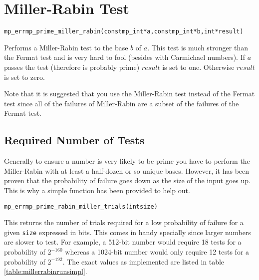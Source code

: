 \documentclass[synpaper]{book}
\begin{document}
\section{Miller-Rabin Test}
\begin{alltt}
mp_err mp_prime_miller_rabin (const mp_int *a, const mp_int *b, int *result)
\end{alltt}
Performs a Miller-Rabin test to the base $b$ of $a$.  This test is much stronger than the Fermat test and is very hard to
fool (besides with Carmichael numbers).  If $a$ passes the test (therefore is probably prime) $result$ is set to one.
Otherwise $result$ is set to zero.

Note that it is suggested that you use the Miller-Rabin test instead of the Fermat test since all of the failures of
Miller-Rabin are a subset of the failures of the Fermat test.

\subsection{Required Number of Tests}
Generally to ensure a number is very likely to be prime you have to perform the Miller-Rabin with at least a half-dozen
or so unique bases.  However, it has been proven that the probability of failure goes down as the size of the input goes up.
This is why a simple function has been provided to help out.

\begin{alltt}
mp_err mp_prime_rabin_miller_trials(int size)
\end{alltt}
This returns the number of trials required for a low probability of failure for a given \texttt{size} expressed in bits.  This comes in handy specially since larger numbers are slower to test. For example, a 512-bit number would require 18 tests for a probability of $2^{-160}$ whereas a 1024-bit number would only require 12 tests for a probability of $2^{-192}$. The exact values as implemented are listed in table \ref{table:millerrabinrunsimpl}.
\end{document}
